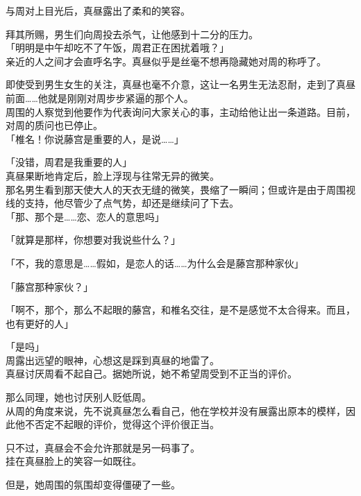 与周对上目光后，真昼露出了柔和的笑容。

拜其所赐，男生们向周投去杀气，让他感到十二分的压力。\\

「明明是中午却吃不了午饭，周君正在困扰着哦？」\\

亲近的人之间才会直呼名字。真昼似乎是丝毫不想再隐藏她对周的称呼了。

即使受到男生女生的关注，真昼也毫不介意，这让一名男生无法忍耐，走到了真昼前面……他就是刚刚对周步步紧逼的那个人。\\

周围的人察觉到他要作为代表询问大家关心的事，主动给他让出一条道路。目前，对周的质问也已停止。\\

「椎名！你说藤宫是重要的人，是说……」

「没错，周君是我重要的人」\\

真昼果断地肯定后，脸上浮现与往常无异的微笑。\\

那名男生看到那天使大人的天衣无缝的微笑，畏缩了一瞬间；但或许是由于周围视线的支持，他尽管少了点气势，却还是继续问了下去。\\

「那、那个是……恋、恋人的意思吗」

「就算是那样，你想要对我说些什么？」

「不，我的意思是……假如，是恋人的话……为什么会是藤宫那种家伙」

「藤宫那种家伙？」

「啊不，那个，那么不起眼的藤宫，和椎名交往，是不是感觉不太合得来。而且，也有更好的人」

「是吗」\\

周露出远望的眼神，心想这是踩到真昼的地雷了。\\

真昼讨厌周看不起自己。据她所说，她不希望周受到不正当的评价。

那么同理，她也讨厌别人贬低周。\\

从周的角度来说，先不说真昼怎么看自己，他在学校并没有展露出原本的模样，因此他不否定不起眼的评价，觉得这个评价很正当。

只不过，真昼会不会允许那就是另一码事了。\\

挂在真昼脸上的笑容一如既往。

但是，她周围的氛围却变得僵硬了一些。\\

